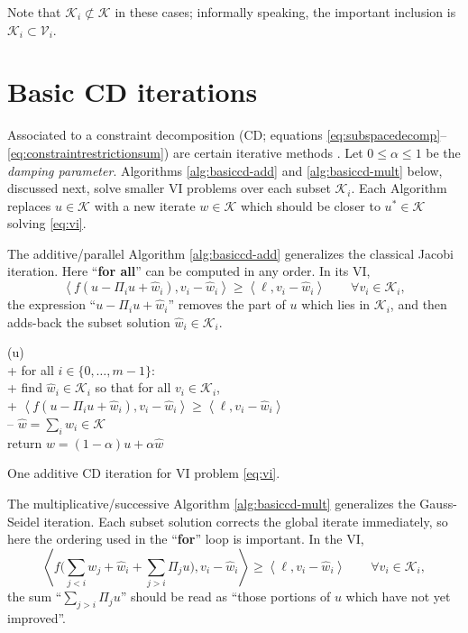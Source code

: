 \documentclass[letterpaper,final,12pt,reqno]{amsart}
\theoremstyle{cstyle}
\theoremstyle{cstyle*}
\theoremstyle{dstyle}
\numberwithin{equation}{section}
\numberwithin{figure}{section}
\numberwithin{table}{section}
\numberwithin{theorem}{section}
\newcommand{\cK}{\mathcal{K}}
\newcommand{\cV}{\mathcal{V}}
\newcommand{\ip}[2]{\left<#1,#2\right>}
\begin{document}
Note that $\cK_i \not\subset \cK$ in these cases; informally speaking, the important inclusion is $\cK_i \subset \cV_i$.


\section{Basic CD iterations} \label{sec:cditers}

Associated to a constraint decomposition (CD; equations \eqref{eq:subspacedecomp}--\eqref{eq:constraintrestrictionsum}) are certain iterative methods \cite{Tai2003,Xu1992}.  Let $0\le \alpha \le 1$ be the \emph{damping parameter}.  Algorithms \ref{alg:basiccd-add} and \ref{alg:basiccd-mult} below, discussed next, solve smaller VI problems over each subset $\cK_i$.  Each Algorithm replaces $u \in \cK$ with a new iterate $w\in\cK$ which should be closer to $u^* \in \cK$ solving \eqref{eq:vi}.

The additive/parallel  Algorithm \ref{alg:basiccd-add} generalizes the classical Jacobi iteration.  Here ``\textbf{for all}'' can be computed in any order.  In its VI,
\begin{equation}
\ip{f(u - \Pi_i u + \hat w_i)}{v_i-\hat w_i} \ge \ip{\ell}{v_i-\hat w_i} \qquad \forall v_i \in \mathcal{K}_i, \label{eq:cdaddvi}
\end{equation}
the expression ``$u-\Pi_iu+\hat w_i$'' removes the part of $u$ which lies in $\mathcal{K}_i$, and then adds-back the subset solution $\hat w_i \in \mathcal{K}_i$.

\begin{pseudofloat}[H]
\begin{pseudo*}
(u)\text{:} \\+
    for all $i \in \{0,\dots,m-1\}$: \\+
        \rm{find} $\hat w_i\in \cK_i$ \rm{so that for all} $v_i\in \cK_i$, \\+
            $\ip{f(u - \Pi_i u + \hat w_i)}{v_i-\hat w_i} \ge \ip{\ell}{v_i-\hat w_i}$ \\--
    $\hat w = \sum_i \hat w_i\in\cK$ \\
    return $w=(1-\alpha) u + \alpha \hat w$
\end{pseudo*}
\caption{One additive CD iteration for VI problem \eqref{eq:vi}.}
\label{alg:basiccd-add}
\end{pseudofloat}

The multiplicative/successive  Algorithm \ref{alg:basiccd-mult} generalizes the Gauss-Seidel iteration.  Each subset solution corrects the global iterate immediately, so here the ordering used in the ``\textbf{for}'' loop is important.  In the VI,
\begin{equation}
\ip{f\Big(\sum_{j<i} w_j + \hat w_i + \sum_{j>i} \Pi_j u\Big)}{v_i-\hat w_i} \ge \ip{\ell}{v_i-\hat w_i} \qquad \forall v_i \in \mathcal{K}_i, \label{eq:cdmultvi}
\end{equation}
the sum ``$\sum_{j>i} \Pi_j u$'' should be read as ``those portions of $u$ which have not yet improved''.
\end{document}
